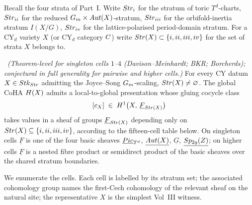 Recall the four strata of Part~I. Write $Str_{i}$ for the stratum of
toric $T^{d}$-charts, $Str_{ii}$ for the reduced
$G_{m}\times Aut(X)$-stratum, $Str_{iii}$ for the orbifold-inertia
stratum $I(X/G)$, $Str_{iv}$ for the lattice-polarised period-domain
stratum. For a CY$_d$ variety $X$ (or CY$_d$ category $C$) write
$Str(X)\subset\{i,ii,iii,iv\}$ for the set of strata $X$ belongs to.

\begin{theorem}
\label{gluing:thm:fifteen-cell-classification}
\ClaimStatusConjectured\ \emph{(Theorem-level for singleton cells
$1$--$4$ (Davison--Meinhardt; BKR; Borcherds); conjectural in full
generality for pairwise and higher cells.)} For every CY datum
$X\in Stk_{Str}$ admitting the Joyce--Song $G_{m}$-scaling,
$Str(X)\neq\varnothing$. The global CoHA $H(X)$ admits a
local-to-global presentation whose gluing cocycle class
\[
[c_{X}]\;\in\;H^{1}\bigl(X,\,\underline{F}_{Str(X)}\bigr)
\]
takes values in a sheaf of groups $\underline{F}_{Str(X)}$ depending
only on $Str(X)\subseteq\{i,ii,iii,iv\}$, according to the
fifteen-cell table below. On singleton cells $\underline{F}$ is one
of the four basic sheaves $\underline{Pic}_{T^{d}}$,
$\underline{Aut(X)}$, $\underline{G}$, $\underline{Sp_{2g}(Z)}$;
on higher cells $\underline{F}$ is a nested fibre product or
semidirect product of the basic sheaves over the shared stratum
boundaries.
\end{theorem}

\noindent We enumerate the cells. Each cell is labelled by its stratum
set; the associated cohomology group names the first-Cech cohomology
of the relevant sheaf on the natural site; the representative $X$ is
the simplest Vol~III witness.

